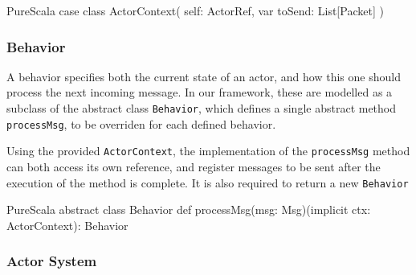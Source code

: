 \documentclass[a4paper,twoside]{article}
\newcommand{\InlineS}[1]{\lstinline[language=PureScala,basicstyle=\small\ttfamily,columns=fixed]|#1|}
\begin{document}
\begin{ShortCode}{PureScala}
case class ActorContext(
  self: ActorRef,
  var toSend: List[Packet]
)
\end{ShortCode}

\vspace{-15pt}
\subsubsection*{Behavior}

A behavior specifies both the current state of an actor, and how this one should 
process the next incoming message. In our framework, these are modelled as a subclass 
of the abstract class \InlineS{Behavior}, which defines a single abstract method 
\InlineS{processMsg}, to be overriden for each defined behavior.

Using the provided \InlineS{ActorContext}, the implementation of the \InlineS{processMsg}
method can both access its own reference, and register messages to be sent after the
execution of the method is complete. It is also required to return a new \InlineS{Behavior}

\begin{ShortCode}{PureScala}
abstract class Behavior {
  def processMsg(msg: Msg)(implicit ctx: ActorContext): Behavior
}
\end{ShortCode}

%
%

\vspace{-15pt}
\subsubsection*{Actor System}
\end{document}
